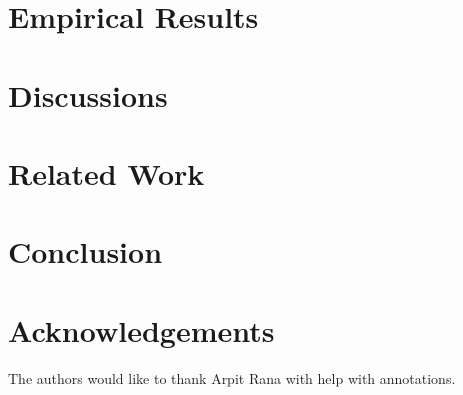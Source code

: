 \documentclass[a4paper,man,natbib]{apa6}
\begin{document}
\section{Empirical Results}
\label{emp}

\section{Discussions}

\section{Related Work}
\label{related}




\section{Conclusion}
\label{conc}

\section{Acknowledgements}
The authors would like to thank Arpit Rana with help with annotations.
%
%
%






\end{document}
